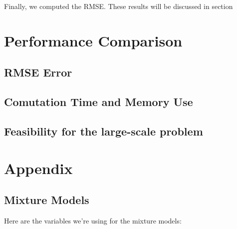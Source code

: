 \documentclass{article}
\begin{document}

Finally, we computed the RMSE. These results will be discussed in
section 



%


\section{Performance Comparison}
\subsection{RMSE Error}
\subsection{Comutation Time and Memory Use}
\subsection{Feasibility for the large-scale problem}

\section{Appendix}

\subsection{Mixture Models}
\label{sec:appendix-mixture}

Here are the variables we're using for the mixture models:
\end{document}
